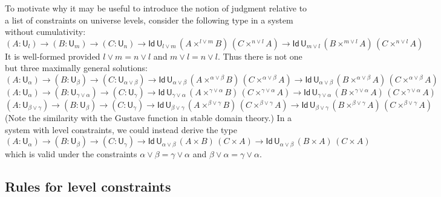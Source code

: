 \documentclass[11pt,a4paper]{article}
\newcommand{\Id}{\mathsf{Id}}
\def\UU{\mathsf{U}}
\begin{document}
To motivate why it may be useful to introduce the notion of judgment relative to a list of constraints on universe levels, consider the following type in a system without cumulativity:
%
$$
    (A : \UU_l) \to (B : \UU_m) \to (C : \UU_n) 
    \to \Id\,\UU_{l \vee m}\, (A\times^{l \vee m} B)\,(C \times^{n \vee l} A)
    \to \Id\,\UU_{m \vee l} \, (B\times^{m \vee l} A)\,(C \times^{n \vee l} A)
$$
It is well-formed provided $l \vee m = n \vee l$ and $m \vee l = n \vee l$. Thus there is not one but three maximally general solutions: 
$$
    (A : \UU_\alpha) \to (B : \UU_\beta) \to (C : \UU_{\alpha \vee \beta}) 
    \to \Id\,\UU_{\alpha \vee \beta}\, (A\times^{\alpha \vee \beta} B)\,(C \times^{\alpha \vee \beta} A)
    \to \Id\,\UU_{\alpha \vee \beta}\, (B\times^{\alpha \vee \beta} A)\,(C \times^{\alpha \vee \beta} A)
$$
$$
    (A : \UU_\alpha) \to (B : \UU_{\gamma \vee \alpha}) \to (C : \UU_{\gamma}) 
    \to \Id\,\UU_{\gamma \vee \alpha}\, (A\times^{\gamma \vee \alpha} B)\,(C \times^{\gamma \vee \alpha} A)
    \to \Id\,\UU_{\gamma \vee \alpha}\, (B\times^{\gamma \vee \alpha} A)\,(C \times^{\gamma \vee \alpha} A)
$$
$$
    (A : \UU_{\beta \vee \gamma}) \to (B : \UU_{\beta}) \to (C : \UU_{\gamma}) 
    \to \Id\,\UU_{\beta \vee \gamma}\, (A\times^{\beta \vee \gamma} B)\,(C \times^{\beta \vee \gamma} A)
    \to \Id\,\UU_{\beta \vee \gamma}\, (B\times^{\beta \vee \gamma} A)\,(C \times^{\beta \vee \gamma} A)
$$
(Note the similarity with the Gustave function in stable domain theory.)
In a system with level constraints, we could instead derive the type
$$
    (A : \UU_\alpha) \to (B : \UU_\beta) \to (C : \UU_\gamma) 
    \to \Id\,\UU_{\alpha \vee \beta}\, (A\times B)\,(C \times A)
    \to \Id\,\UU_{\alpha \vee \beta}\, (B\times A)\,(C \times A)
$$
which is valid under the constraints
$
\alpha \vee \beta = \gamma \vee \alpha
$
and 
$
\beta \vee \alpha = \gamma \vee \alpha.
$

\subsection{Rules for level constraints}
\end{document}
